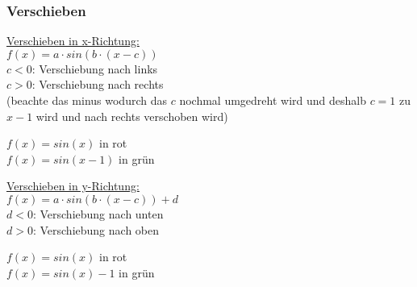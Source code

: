 \subsubsection{Verschieben}
\underline{Verschieben in x-Richtung:} \\
$f(x) = a\cdot sin(b\cdot(x - c))$ \\
$c < 0$: Verschiebung nach links \\
$c > 0$: Verschiebung nach rechts \\
(beachte das minus wodurch das $c$ nochmal umgedreht wird und deshalb $c = 1$ zu $x - 1$ wird und nach rechts verschoben wird)

$f(x) = sin(x)$ in rot \\
$f(x) = sin(x-1)$ in grün \\

\underline{Verschieben in y-Richtung:} \\
$f(x) = a\cdot sin(b\cdot(x - c)) + d$ \\
$d < 0$: Verschiebung nach unten \\
$d > 0$: Verschiebung nach oben

$f(x) = sin(x)$ in rot \\
$f(x) = sin(x) - 1$ in grün \\
